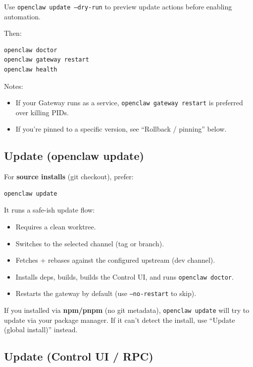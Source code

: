Use \texttt{openclaw update --dry-run} to preview update actions before enabling automation.

Then:

\begin{lstlisting}[language=bash]
openclaw doctor
openclaw gateway restart
openclaw health
\end{lstlisting}


Notes:

\begin{itemize}
  \item If your Gateway runs as a service, \texttt{openclaw gateway restart} is preferred over killing PIDs.
  \item If you’re pinned to a specific version, see “Rollback / pinning” below.
\end{itemize}


\subsection{Update (openclaw update)}


For \textbf{source installs} (git checkout), prefer:

\begin{lstlisting}[language=bash]
openclaw update
\end{lstlisting}


It runs a safe-ish update flow:

\begin{itemize}
  \item Requires a clean worktree.
  \item Switches to the selected channel (tag or branch).
  \item Fetches + rebases against the configured upstream (dev channel).
  \item Installs deps, builds, builds the Control UI, and runs \texttt{openclaw doctor}.
  \item Restarts the gateway by default (use \texttt{--no-restart} to skip).
\end{itemize}


If you installed via \textbf{npm/pnpm} (no git metadata), \texttt{openclaw update} will try to update via your package manager. If it can’t detect the install, use “Update (global install)” instead.

\subsection{Update (Control UI / RPC)}


